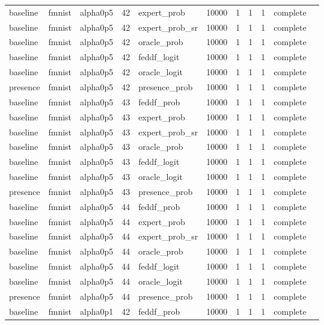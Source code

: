 \begin{tabular}{lllrlrrrrll}
baseline & fmnist & alpha0p5 & 42 & expert\_prob & 10000 & 1 & 1 & 1 & complete &  \\
baseline & fmnist & alpha0p5 & 42 & expert\_prob\_sr & 10000 & 1 & 1 & 1 & complete &  \\
baseline & fmnist & alpha0p5 & 42 & oracle\_prob & 10000 & 1 & 1 & 1 & complete &  \\
baseline & fmnist & alpha0p5 & 42 & feddf\_logit & 10000 & 1 & 1 & 1 & complete &  \\
baseline & fmnist & alpha0p5 & 42 & oracle\_logit & 10000 & 1 & 1 & 1 & complete &  \\
presence & fmnist & alpha0p5 & 42 & presence\_prob & 10000 & 1 & 1 & 1 & complete &  \\
baseline & fmnist & alpha0p5 & 43 & feddf\_prob & 10000 & 1 & 1 & 1 & complete &  \\
baseline & fmnist & alpha0p5 & 43 & expert\_prob & 10000 & 1 & 1 & 1 & complete &  \\
baseline & fmnist & alpha0p5 & 43 & expert\_prob\_sr & 10000 & 1 & 1 & 1 & complete &  \\
baseline & fmnist & alpha0p5 & 43 & oracle\_prob & 10000 & 1 & 1 & 1 & complete &  \\
baseline & fmnist & alpha0p5 & 43 & feddf\_logit & 10000 & 1 & 1 & 1 & complete &  \\
baseline & fmnist & alpha0p5 & 43 & oracle\_logit & 10000 & 1 & 1 & 1 & complete &  \\
presence & fmnist & alpha0p5 & 43 & presence\_prob & 10000 & 1 & 1 & 1 & complete &  \\
baseline & fmnist & alpha0p5 & 44 & feddf\_prob & 10000 & 1 & 1 & 1 & complete &  \\
baseline & fmnist & alpha0p5 & 44 & expert\_prob & 10000 & 1 & 1 & 1 & complete &  \\
baseline & fmnist & alpha0p5 & 44 & expert\_prob\_sr & 10000 & 1 & 1 & 1 & complete &  \\
baseline & fmnist & alpha0p5 & 44 & oracle\_prob & 10000 & 1 & 1 & 1 & complete &  \\
baseline & fmnist & alpha0p5 & 44 & feddf\_logit & 10000 & 1 & 1 & 1 & complete &  \\
baseline & fmnist & alpha0p5 & 44 & oracle\_logit & 10000 & 1 & 1 & 1 & complete &  \\
presence & fmnist & alpha0p5 & 44 & presence\_prob & 10000 & 1 & 1 & 1 & complete &  \\
baseline & fmnist & alpha0p1 & 42 & feddf\_prob & 10000 & 1 & 1 & 1 & complete &  \\

\end{tabular}
